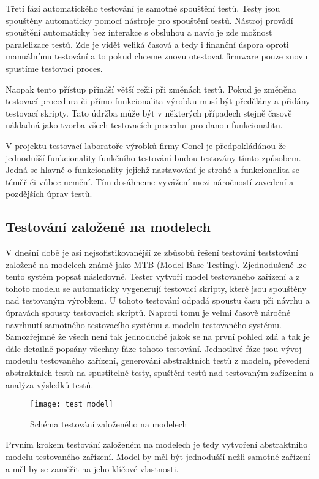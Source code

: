 Třetí fází automatického testování je samotné spouštění testů. Testy jsou spouštěny automaticky pomocí nástroje pro spouštění testů. Nástroj provádí spouštění automaticky bez interakce s obsluhou a navíc je zde možnost paralelizace testů. Zde je vidět veliká časová a tedy i finanční úspora oproti manuálnímu testování a to pokud chceme znovu otestovat firmware pouze znovu spustíme testovací proces.

Naopak tento přístup přináší větší režii při změnách testů. Pokud je změněna testovací procedura či přímo funkcionalita výrobku musí být předělány a přidány testovací skripty. Tato údržba může být v některých případech stejně časově nákladná jako tvorba všech testovacích procedur pro danou funkcionalitu.

V projektu testovací laboratoře výrobků firmy Conel je předpokládánou že jednodušší funkcionality funkčního testování budou testovány tímto způsobem. Jedná se hlavně o funkcionality jejichž nastavování je strohé a funkcionalita se téměř či vůbec nemění. Tím dosáhneme vyvážení mezi náročností zavedení a pozdějších úprav testů.

\subsection{Testování založené na modelech}
V dnešní době je asi nejsofistikovanější ze zbůsobů řešení testování teststování založené na modelech známé jako MTB (Model Base Testing). Zjednodušeně lze tento systém popsat následovně. Tester vytvoří model testovaného zařízení a z tohoto modelu se automaticky vygenerují testovací skripty, které jsou spouštěny nad testovaným výrobkem. U tohoto testování odpadá spoustu času při návrhu a úpravách spousty testovacích skriptů. Naproti tomu je velmi časově náročné navrhnutí samotného testovacího systému a modelu testovaného systému. Samozřejmně že všech není tak jednoduché jakok se na první pohled zdá a tak je dále detailně popsány všechny fáze tohoto testování. Jednotlivé fáze jsou vývoj modeulu testovaného zařízení, generování abstraktních testů z modelu, převedení abstraktních testů na spustitelné testy, spuštění testů nad testovaným zařízením a analýza výsledků testů.

\begin{figure}[h]
  \centering
  \texttt{[image: test\_model]}
  \caption{Schéma testování založeného na modelech}
  \label{fig:test_model}
\end{figure}

Prvním krokem testování založeném na modelech je tedy vytvoření abstraktního modelu testovaného zařízení. Model by měl být jednodušší nežli samotné zařízení a měl by se zaměřit na jeho klíčové vlastnosti.

